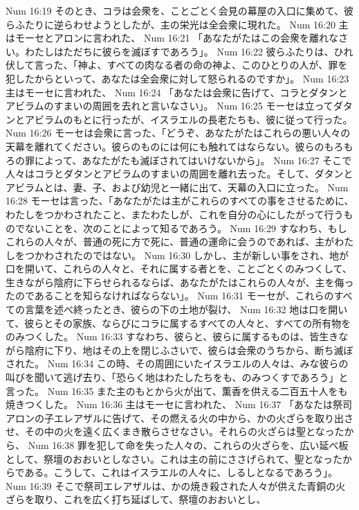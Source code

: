 Num 16:19  そのとき、コラは会衆を、ことごとく会見の幕屋の入口に集めて、彼らふたりに逆らわせようとしたが、主の栄光は全会衆に現れた。
Num 16:20  主はモーセとアロンに言われた、
Num 16:21  「あなたがたはこの会衆を離れなさい。わたしはただちに彼らを滅ぼすであろう」。
Num 16:22  彼らふたりは、ひれ伏して言った、「神よ、すべての肉なる者の命の神よ、このひとりの人が、罪を犯したからといって、あなたは全会衆に対して怒られるのですか」。
Num 16:23  主はモーセに言われた、
Num 16:24  「あなたは会衆に告げて、コラとダタンとアビラムのすまいの周囲を去れと言いなさい」。
Num 16:25  モーセは立ってダタンとアビラムのもとに行ったが、イスラエルの長老たちも、彼に従って行った。
Num 16:26  モーセは会衆に言った、「どうぞ、あなたがたはこれらの悪い人々の天幕を離れてください。彼らのものには何にも触れてはならない。彼らのもろもろの罪によって、あなたがたも滅ぼされてはいけないから」。
Num 16:27  そこで人々はコラとダタンとアビラムのすまいの周囲を離れ去った。そして、ダタンとアビラムとは、妻、子、および幼児と一緒に出て、天幕の入口に立った。
Num 16:28  モーセは言った、「あなたがたは主がこれらのすべての事をさせるために、わたしをつかわされたこと、またわたしが、これを自分の心にしたがって行うものでないことを、次のことによって知るであろう。
Num 16:29  すなわち、もしこれらの人々が、普通の死に方で死に、普通の運命に会うのであれば、主がわたしをつかわされたのではない。
Num 16:30  しかし、主が新しい事をされ、地が口を開いて、これらの人々と、それに属する者とを、ことごとくのみつくして、生きながら陰府に下らせられるならば、あなたがたはこれらの人々が、主を侮ったのであることを知らなければならない」。
Num 16:31  モーセが、これらのすべての言葉を述べ終ったとき、彼らの下の土地が裂け、
Num 16:32  地は口を開いて、彼らとその家族、ならびにコラに属するすべての人々と、すべての所有物をのみつくした。
Num 16:33  すなわち、彼らと、彼らに属するものは、皆生きながら陰府に下り、地はその上を閉じふさいで、彼らは会衆のうちから、断ち滅ぼされた。
Num 16:34  この時、その周囲にいたイスラエルの人々は、みな彼らの叫びを聞いて逃げ去り、「恐らく地はわたしたちをも、のみつくすであろう」と言った。
Num 16:35  また主のもとから火が出て、薫香を供える二百五十人をも焼きつくした。
Num 16:36  主はモーセに言われた、
Num 16:37  「あなたは祭司アロンの子エレアザルに告げて、その燃える火の中から、かの火ざらを取り出させ、その中の火を遠く広くまき散らさせなさい。それらの火ざらは聖となったから、
Num 16:38  罪を犯して命を失った人々の、これらの火ざらを、広い延べ板として、祭壇のおおいとしなさい。これは主の前にささげられて、聖となったからである。こうして、これはイスラエルの人々に、しるしとなるであろう」。
Num 16:39  そこで祭司エレアザルは、かの焼き殺された人々が供えた青銅の火ざらを取り、これを広く打ち延ばして、祭壇のおおいとし、

